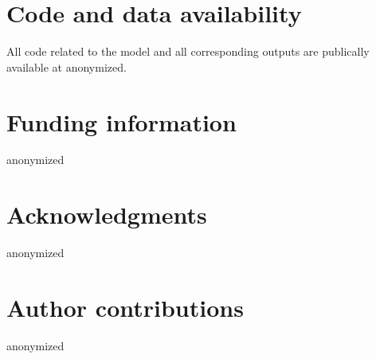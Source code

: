 \documentclass{article}
\begin{document}
\section{Code and data availability}

All code related to the model and all corresponding outputs are publically available at anonymized.

\section{Funding information}

anonymized 

\section{Acknowledgments}

anonymized

\section{Author contributions}

anonymized

\printbibliography
\end{document}
